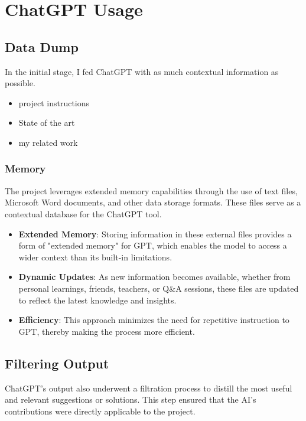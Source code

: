 \documentclass{article}
\begin{document}
\section{ChatGPT Usage}
\subsection{Data Dump}
In the initial stage, I fed ChatGPT with as much contextual information as possible. 
\begin{itemize}
    \item project instructions
    \item State of the art
    \item my related work
\end{itemize}

\subsubsection{Memory}
The project leverages extended memory capabilities through the use of text files, Microsoft Word documents, and other data storage formats. These files serve as a contextual database for the ChatGPT tool. 

\begin{itemize}
    \item \textbf{Extended Memory}: Storing information in these external files provides a form of "extended memory" for GPT, which enables the model to access a wider context than its built-in limitations.
    \item \textbf{Dynamic Updates}: As new information becomes available, whether from personal learnings, friends, teachers, or Q\&A sessions, these files are updated to reflect the latest knowledge and insights.
    \item \textbf{Efficiency}: This approach minimizes the need for repetitive instruction to GPT, thereby making the process more efficient.
\end{itemize}
\subsection{Filtering Output}
ChatGPT's output also underwent a filtration process to distill the most useful and relevant suggestions or solutions. 
This step ensured that the AI's contributions were directly applicable to the project.
\end{document}
